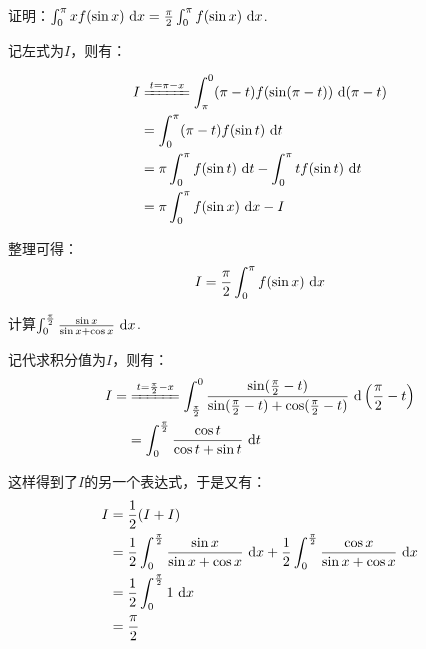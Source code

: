 \begin{example}
\label{ex:ch03-35}
证明：$\int_{0}^{\pi} xf(\sin x)~\mathrm{d} x =\frac{\pi}{2} \int_{0}^{\pi} f(\sin x) ~\mathrm{d} x$.
\end{example}

\begin{solution}
记左式为$I$，则有：

\begin{equation}
    \begin{aligned}
        I
        &\xlongequal{t = \pi -x} \int_{\pi}^{0} (\pi -t)f(\sin(\pi -t)) ~\d(\pi -t)\\
        &= \int_{0}^{\pi} (\pi -t) f(\sin t) ~\d t \\
        &= \pi \int_{0}^{\pi} f(\sin t) ~\d t -\int_{0}^{\pi} tf(\sin t) ~\d t \\
        &= \pi \int_{0}^{\pi} f(\sin x) ~\d x - I
        \nonumber
    \end{aligned}
\end{equation} \par
整理可得：
$$
I = \frac{\pi}{2} \int_{0}^{\pi} f(\sin x) ~\mathrm{d} x
$$
\end{solution}

\begin{example}
\label{ex:ch03-36}
计算$\int_{0}^{\frac{\pi}{2}} \frac{\sin x}{\sin x +\cos x}~\mathrm{d} x$.
\end{example}

\begin{solution}
记代求积分值为$I$，则有：
\begin{equation}
    \begin{aligned}
        I = &\xlongequal{t = \frac{\pi}{2}-x} \int_{\frac{\pi}{2}}^{0} \frac{\sin(\frac{\pi}{2}-t)}{\sin(\frac{\pi}{2}-t)+\cos(\frac{\pi}{2}-t)}~\d \left(\frac{\pi}{2}-t \right) \\
        &= \int_{0}^{\frac{\pi}{2}} \frac{\cos t}{\cos t +\sin t} ~\d t
        \nonumber
    \end{aligned}
\end{equation}

这样得到了$I$的另一个表达式，于是又有：
\begin{equation}
    \begin{aligned}
        I
        &= \frac{1}{2}(I+I) \\
        &= \frac{1}{2} \int_{0}^{\frac{\pi}{2}} \frac{\sin x}{\sin x +\cos x} ~\mathrm{d} x +\frac{1}{2} \int_{0}^{\frac{\pi}{2}} \frac{\cos x}{\sin x +\cos x} ~\mathrm{d} x \\
        &= \frac{1}{2} \int_{0}^{\frac{\pi}{2}} 1 ~\mathrm{d} x \\
        &= \frac{\pi}{2}
        \nonumber
    \end{aligned}
\end{equation}
\end{solution}

